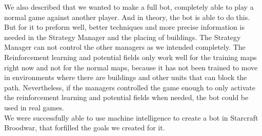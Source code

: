We also described that we wanted to make a full bot, completely able to play a normal game against another player. And in theory, the bot is able to do this. But for it to preform well, better techniques and more precise information is needed in the Strategy Manager and the placing of buildings. The Strategy Manager can not control the other managers as we intended completely. The Reinforcement learning and potential fields only work well for the training maps right now and not for the normal maps, because it has not been trained to move in environments where there are buildings and other units that can block the path. Nevertheless, if the managers controlled the game enough to only activate the reinforcement learning and potential fields when needed, the bot could be used in real games.\\

We were successfully able to use machine intelligence to create a bot in Starcraft Broodwar, that forfilled the goals we created for it.


